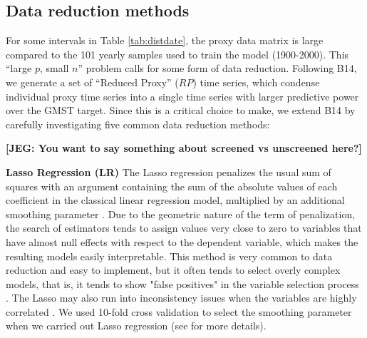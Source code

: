 \documentclass[12pt]{amsart}
\theoremstyle{plain}
\theoremstyle{definition}
\theoremstyle{remark}
\newcommand{\jeg}[1]{\color{ProcessBlue}\textbf{[JEG: #1]}\normalcolor}
\begin{document}
\subsection{Data reduction methods}
\label{sec:rp}

For some intervals in Table \ref{tab:distdate}, the proxy data matrix is large compared to the 101 yearly samples used to train the model (1900-2000). This ``large $p$, small $n$'' problem calls for some form of data reduction. Following B14, we generate a set of ``Reduced Proxy'' ($RP$) time series, which condense individual proxy time series into a single time series with larger predictive power over the GMST target. Since this is a critical choice to make, we extend B14 by carefully investigating five common data reduction methods:

\jeg{You want to say something about screened vs unscreened here?}



{\bf Lasso Regression (LR)}
  The Lasso regression penalizes the usual sum of squares with an argument
 containing the sum of the absolute values of each coefficient in the classical
 linear regression model, multiplied by an additional smoothing parameter \citep{Tibshirani1996}. Due
 to the geometric nature of the term of penalization, the search of estimators
 tends to assign values very close to zero to variables that have almost null
 effects with respect to the dependent variable, which makes the resulting
 models easily interpretable. This method is very common to data reduction and easy to implement, but it often tends to select overly complex models, that is,
 it tends to show "false positives" in the variable selection process 
 \citep{Fan2010}. The Lasso may also run into inconsistency issues when the
 variables are highly correlated \citep{Zou2005}.
 We used 10-fold cross validation to select the smoothing parameter when we carried out Lasso regression (see \cite{Tibshirani1996} for more details). 
 
\end{document}
